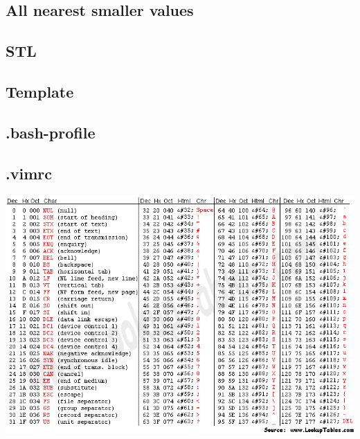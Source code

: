 \documentclass[a4paper]{article}
\begin{document}
\begin{multicols*}{3}
    \subsection{All nearest smaller values}
        
    \subsection{STL}
        
    \subsection{Template}
        
    \subsection{.bash-profile}
        
    \subsection{.vimrc}
        
    \includegraphics[width=\linewidth]{other/asciifull.png}


\end{multicols*}
\end{document}
